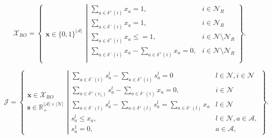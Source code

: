 \begin{equation}
\label{def:domain_xro}
\mathcal{X}_{RO} = \left\{
\left. \begin{array}{l} \mathbf{x} \in \{0,1\}^{|\mathcal{A}|}  \end{array} \right.  \left\vert
\begin{array}{ll}
\sum \limits_{a \in \delta^+(i)} x_a = 1, & i \in \mathcal{N}_R \\
\sum \limits_{a \in \delta^-(i)} x_a = 1, & i \in \mathcal{N}_R \\
\sum \limits_{a \in \delta^+(i)} x_a \leq= 1, & i \in \mathcal{N}\setminus \mathcal{N}_R \\
\sum \limits_{a \in \delta^-(i)} x_a - \sum \limits_{a \in \delta^+(i)} x_a= 0, & i \in \mathcal{N} \setminus \mathcal{N}_R\\
\end{array}\right. \right\}.
\end{equation}

\begin{equation}
\label{def:domain1}
\mathcal{J} = \left\{
\left. \begin{array}{l} \mathbf{x} \in \mathcal{X}_{RO} \\\mathbf{s} \in \mathbb{R}_+^{|\mathcal{A}|\times |\mathcal{N}|} \end{array} \right.  \left\vert
\begin{array}{ll}
\sum \limits_{a \in \delta^-(i)} s^l_a - \sum \limits_{a \in \delta^+(i)} s^l_a = 0 & l \in \mathcal{N}, i \in \mathcal{N}\\ 
\sum \limits_{a \in \delta^+(v_1)} s^l_a - \sum \limits_{a \in \delta^-(i)} x_a=0, & i \in \mathcal{N}\\
\sum \limits_{a \in \delta^-(l)} s^l_a - \sum \limits_{a \in \delta^+(l)} s^l_a = \sum \limits_{a \in \delta^-(l)} x_a & l \in \mathcal{N}\\ 
s^l_a \leq x_a, & l \in \mathcal{N}, a \in \mathcal{A},\\
s^1_a = 0, & a \in \mathcal{A},
\end{array}\right. \right\}.
\end{equation}



